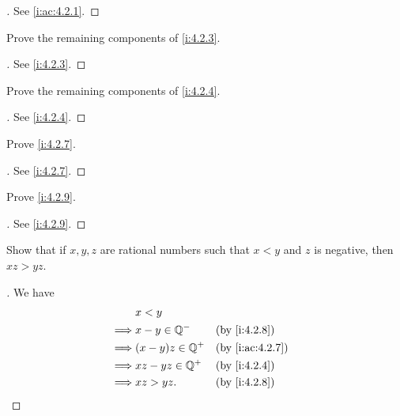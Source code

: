 \begin{proof}[]
  See \cref{i:ac:4.2.1}.
\end{proof}

\begin{ex}\label{i:ex:4.2.2}
  Prove the remaining components of \cref{i:4.2.3}.
\end{ex}

\begin{proof}[]
  See \cref{i:4.2.3}.
\end{proof}

\begin{ex}\label{i:ex:4.2.3}
  Prove the remaining components of \cref{i:4.2.4}.
\end{ex}

\begin{proof}[]
  See \cref{i:4.2.4}.
\end{proof}

\begin{ex}\label{i:ex:4.2.4}
  Prove \cref{i:4.2.7}.
\end{ex}

\begin{proof}[]
  See \cref{i:4.2.7}.
\end{proof}

\begin{ex}\label{i:ex:4.2.5}
  Prove \cref{i:4.2.9}.
\end{ex}

\begin{proof}[]
  See \cref{i:4.2.9}.
\end{proof}

\begin{ex}\label{i:ex:4.2.6}
  Show that if \(x, y, z\) are rational numbers such that \(x < y\) and \(z\) is negative, then \(xz > yz\).
\end{ex}

\begin{proof}[]
  We have
  \begin{align*}
             & x < y                                  \\
    \implies & x - y \in \Q^-    &  & \by{i:4.2.8}    \\
    \implies & (x - y)z \in \Q^+ &  & \by{i:ac:4.2.7} \\
    \implies & xz - yz \in \Q^+  &  & \by{i:4.2.4}    \\
    \implies & xz > yz.          &  & \by{i:4.2.8}
  \end{align*}
\end{proof}
